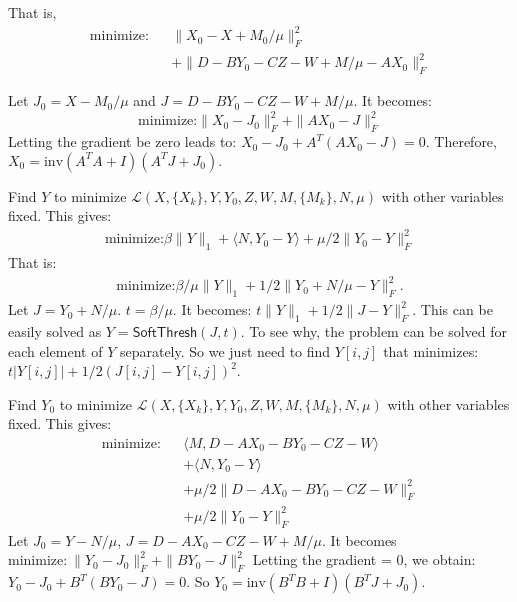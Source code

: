 \begin{senumerate}
That is,
\begin{eqnarray}
  \text{minimize:} && \|X_{0}-X+M_{0}/\mu\|_F^2 \nonumber\\
  && + \|D-BY_0-CZ-W+M/\mu - AX_{0}\|_F^2\nonumber
\end{eqnarray}

Let $J_0=X-M_{0}/\mu$ and $J=D-BY_0-CZ-W+M/\mu$.  It becomes:
\[
  \text{minimize:} \|X_{0}-J_0\|_F^2 + \|AX_{0}-J\|_F^2
\]
Letting the gradient be zero leads to:
$X_{0}-J_0 + A^T(A X_{0}-J) = 0.$
Therefore,
$X_{0} = \mathrm{inv}(A^T A+I)  (A^T J + J_0).$
         
\item Find $Y$ to minimize
$\mathcal{L}(X,\{X_k\},Y,Y_0,Z,W,M,\{M_k\},N,\mu)$ with other
variables fixed. This gives:
\begin{eqnarray}
  \text{minimize:} \beta\|Y\|_1 + \langle N,Y_0-Y\rangle + \mu/2 \|Y_0-Y\|_F^2\nonumber
\end{eqnarray} 
That is:
\begin{eqnarray}
  \text{minimize:} \beta/\mu \|Y\|_1 + 1/2 \|Y_0+N/\mu-Y\|_F^2.\nonumber
\end{eqnarray}
Let $J = Y_0+N/\mu$.  $t = \beta/\mu$.  It becomes: $t\|Y\|_1
+ 1/2\|J-Y\|_F^2$.  This can be easily solved as $Y =
\mathsf{SoftThresh}(J,t)$.  To see why, the problem can be solved for each
element of $Y$ separately.  So we just need to find $Y[i,j]$ that
minimizes: $t|Y[i,j]| + 1/2(J[i,j]-Y[i,j])^2$.

\item Find $Y_0$ to minimize
$\mathcal{L}(X,\{X_k\},Y,Y_0,Z,W,M,\{M_k\},N,\mu)$ with other
variables fixed. This gives:
\begin{eqnarray}
  \text{minimize:} && \langle M,D-AX_{0}-BY_0-CZ-W\rangle \nonumber\\
&&    + \langle N,Y_0-Y\rangle\nonumber\\
&&    + \mu/2 \|D-AX_{0}-BY_0-CZ-W\|_F^2\nonumber\\
&&    + \mu/2 \|Y_0-Y\|_F^2\nonumber
\end{eqnarray}  
Let $J_0 = Y-N/\mu$, $J=D-AX_{0}-CZ-W+M/\mu$.  It becomes
$\text{minimize:}~\|Y_0-J_0\|_F^2 + \|BY_0-J\|_F^2$
Letting the gradient = 0, we obtain:
$Y_0-J_0 + B^T(BY_0-J) = 0.$
So $Y_0 = \mathrm{inv}(B^TB+I) (B^TJ + J_0).$


\end{senumerate}
